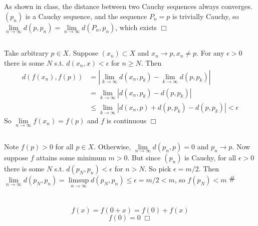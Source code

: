 \documentclass{article}
\newcommand{\contra}{\raisebox{\depth}{\#}}
\begin{document}
\section{}
\subsection{}
As shown in class, the distance between two Cauchy sequences always converges. $(p_n)$ is a Cauchy sequence, and the sequence $P_n = p$ is trivially Cauchy, so $\lim\limits_{n\rightarrow\infty} d(p,p_n) = \lim\limits_{n\rightarrow\infty}d(P_n,p_n)$, which exists $\Box$

\subsection{}
Take arbitrary $p \in X$. Suppose $(x_n) \subset X$ and $x_n \rightarrow p, x_n \neq p$. For any $\epsilon > 0$ there is some $N$ s.t. $d(x_n,x) < \epsilon$ for $n\geq N$. Then
\begin{equation*}
    \begin{split}
        d(f(x_n),f(p)) &= |\lim\limits_{k \rightarrow \infty} d(x_n,p_k) - \lim\limits_{k \rightarrow \infty} d(p,p_k)|\\
        &= \lim\limits_{k \rightarrow \infty} |d(x_n,p_k) - d(p,p_k)|\\
        &\leq \lim\limits_{k \rightarrow \infty} |d(x_n,p) + d(p,p_k) - d(p,p_k)| < \epsilon
    \end{split}
\end{equation*}
So $\lim\limits_{n\rightarrow\infty} f(x_n) = f(p)$ and $f$ is continuous $\Box$

\subsection{}
Note $f(p) > 0$ for all $p \in X$. Otherwise, $\lim\limits_{n\rightarrow\infty} d(p_n,p) = 0$ and $p_n \rightarrow p$. Now suppose $f$ attains some minimum $m>0$. But since $(p_n)$ is Cauchy, for all $\epsilon > 0 $ there is some $N$ s.t. $d(p_N,p_n) < \epsilon$ for $n>N$. So pick $\epsilon = m/2$. Then $\lim\limits_{n\rightarrow\infty}d(p_N,p_n) = \limsup\limits_{n\rightarrow\infty} d(p_N,p_n) \leq \epsilon = m/2 < m$, so $f(p_N) < m$ $\contra$ 

\section{}
\subsection{}
$$f(x) = f(0+x) = f(0) + f(x)$$
$$f(0) = 0 \; \Box$$
\end{document}
